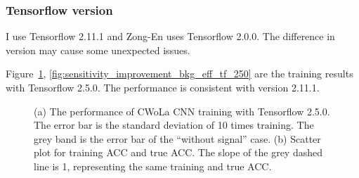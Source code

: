 \documentclass[12pt]{article}
\begin{document}
		\subsubsection{Tensorflow version}%
		\label{subs:tensorflow_version}
			I use Tensorflow 2.11.1 and Zong-En uses Tensorflow 2.0.0. The difference in version may cause some unexpected issues.

			Figure~\ref{fig:cwola_cnn_training_performance_copy_1_tf_250}, \ref{fig:sensitivity_improvement_bkg_eff_tf_250} are the training results with Tensorflow 2.5.0. The performance is consistent with version 2.11.1.
			\begin{figure}[htpb]
				\centering
				\caption{(a) The performance of CWoLa CNN training with Tensorflow 2.5.0. The error bar is the standard deviation of 10 times training. The grey band is the error bar of the ``without signal'' case. (b) Scatter plot for training ACC and true ACC. The slope of the grey dashed line is 1, representing the same training and true ACC.}
				\label{fig:cwola_cnn_training_performance_copy_1_tf_250}
			\end{figure}
\end{document}
